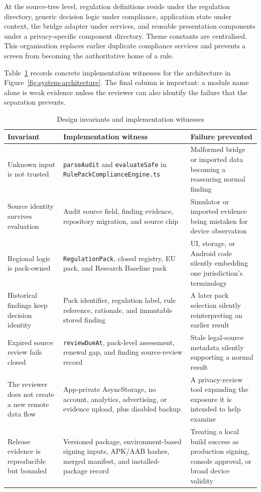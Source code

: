 At the source-tree level, regulation definitions reside under the regulation directory, generic decision logic under compliance, application state under context, the bridge adapter under services, and reusable presentation components under a privacy-specific component directory. Theme constants are centralised. This organisation replaces earlier duplicate compliance services and prevents a screen from becoming the authoritative home of a rule.

Table~\ref{tab:implementation-witnesses} records concrete implementation witnesses for the architecture in Figure~\ref{fig:system-architecture}. The final column is important: a module name alone is weak evidence unless the reviewer can also identify the failure that the separation prevents.

\begin{table}[H]
\centering
\caption{Design invariants and implementation witnesses}
\label{tab:implementation-witnesses}
\scriptsize
\begin{tabular}{>{\raggedright\arraybackslash}p{}>{\raggedright\arraybackslash}p{}>{\raggedright\arraybackslash}p{}}
\toprule
Invariant & Implementation witness & Failure prevented \\
\midrule
Unknown input is not trusted & \texttt{parseAudit} and \texttt{evaluateSafe} in \texttt{RulePackComplianceEngine.ts} & Malformed bridge or imported data becoming a reassuring normal finding \\
Source identity survives evaluation & Audit source field, finding evidence, repository migration, and source chip & Simulator or imported evidence being mistaken for device observation \\
Regional logic is pack-owned & \texttt{RegulationPack}, closed registry, EU pack, and Research Baseline pack & UI, storage, or Android code silently embedding one jurisdiction's terminology \\
Historical findings keep decision identity & Pack identifier, regulation label, rule reference, rationale, and immutable stored finding & A later pack selection silently reinterpreting an earlier result \\
Expired source review fails closed & \texttt{reviewDueAt}, pack-level assessment, renewal gap, and finding source-review record & Stale legal-source metadata silently supporting a normal result \\
The reviewer does not create a new remote data flow & App-private AsyncStorage, no account, analytics, advertising, or evidence upload, plus disabled backup & A privacy-review tool expanding the exposure it is intended to help examine \\
Release evidence is reproducible but bounded & Versioned package, environment-based signing inputs, APK/AAB hashes, merged manifest, and installed-package record & Treating a local build success as production signing, console approval, or broad device validity \\
\bottomrule
\end{tabular}
\end{table}

